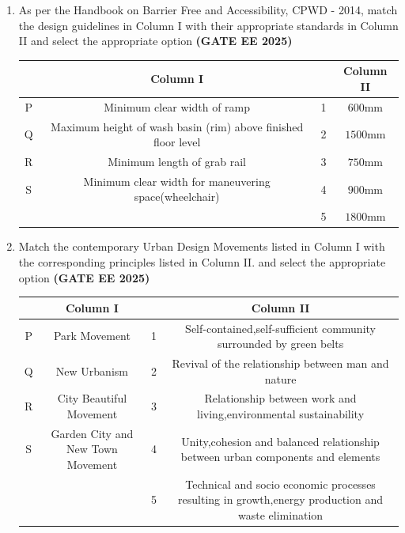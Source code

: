 \documentclass[journal,12pt,onecolumn]{IEEEtran}
\theoremstyle{remark}
\begin{document}
\begin{enumerate}
 \item As per the Handbook on Barrier Free and Accessibility, CPWD - 2014, match the design guidelines in Column I with their appropriate  standards in Column II and select the appropriate option \hfill \textbf{(GATE EE 2025)}\\
 \begin{tabular}{|c|c|c|c|} \hline
  & Column I &  &  Column II \\ \hline
P &Minimum clear width of ramp&1 &$600\text{mm}$  \\ \hline
Q &Maximum height of wash basin (rim) above finished floor level &2&$1500\text{mm}$ \\ \hline
R&Minimum length of grab rail &3&$750\text{mm}$\\ \hline
 S&Minimum clear width for maneuvering space(wheelchair) & 4&$900\text{mm}$ \\ \hline
    &    & 5 & $1800\text{mm}$\\ \hline
 \end{tabular}
 \begin{enumerate}
 \end{enumerate}
 \item Match the contemporary Urban Design Movements listed in Column I with the corresponding principles listed in Column II. and select the appropriate option \hfill \textbf{(GATE EE 2025)}
 \begin{tabular}{|c|c|c|c|}\hline
  & Column I &  & Column II \\ \hline
P & Park Movement&1&Self-contained,self-sufficient community surrounded by green belts  \\ \hline
Q&New Urbanism&2&Revival of the relationship between man and nature\\ \hline
R&City Beautiful Movement &3&Relationship between work and living,environmental sustainability\\ \hline
S&Garden City and New Town Movement &4&Unity,cohesion and balanced relationship between urban components and elements\\ \hline
  &    & 5& Technical and socio economic processes resulting in growth,energy production and waste elimination\\ \hline

\end{tabular}
\end{enumerate}
\end{document}
